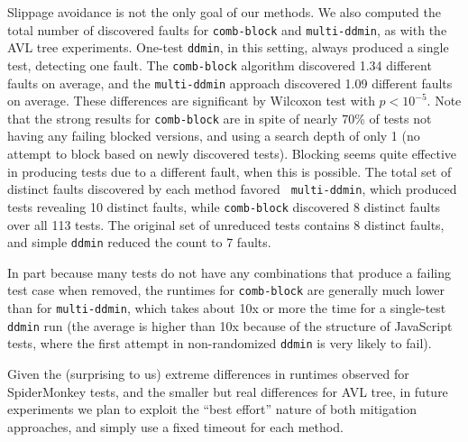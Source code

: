 Slippage avoidance is not the only goal of our methods.  We also computed the total number of discovered faults for
{\tt comb-block} and {\tt multi-ddmin}, as with the AVL tree
experiments.  One-test {\tt ddmin}, in this setting, always produced a
single test, detecting one fault.  The {\tt comb-block} algorithm
discovered 1.34 different faults on average, and the {\tt multi-ddmin}
approach discovered 1.09 different faults on average.  These
differences are significant by Wilcoxon test with $p < 10^{-5}$.  Note
that the strong results for {\tt comb-block} are in spite of nearly
70\% of tests not having any failing blocked versions, and using a
search depth of only 1 (no attempt to block based on newly discovered
tests).  Blocking seems quite effective in producing tests due to a
different fault, when this is possible.  The total set
of distinct faults discovered by each method favored {\tt
  multi-ddmin}, which produced tests revealing 10 distinct faults,
while {\tt comb-block} discovered 8 distinct faults over all 113
tests.  The original set of unreduced tests contains 8 distinct
faults, and simple {\tt ddmin} reduced the count to 7 faults.

In part because many tests do not have any combinations that produce a failing
test case when removed, the runtimes for {\tt comb-block} are
generally much lower than for {\tt multi-ddmin}, which takes about 10x
or more the time for a single-test {\tt ddmin} run (the average is
higher than 10x because of the structure of JavaScript tests, where
the first attempt in non-randomized {\tt ddmin} is very likely to
fail).

Given the (surprising to us) extreme differences in runtimes observed
for SpiderMonkey tests, and the smaller but real differences for AVL tree,
in future experiments we plan to exploit the ``best effort'' nature of
both mitigation approaches, and simply use a fixed timeout for each method.